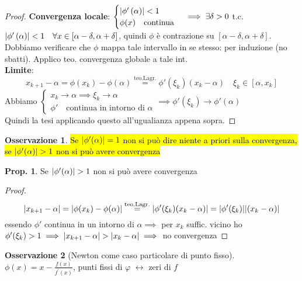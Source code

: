 \documentclass[a4paper,10pt]{article}
\theoremstyle{definition}
\theoremstyle{indentdefinition}
\theoremstyle{indenttheorem}
\newtheorem{prop}{Prop.}
\theoremstyle{myremark}
\newtheorem*{rem*}{Osservazione}
\theoremstyle{indentgeneral}
\theoremstyle{plain}
\theoremstyle{plain}
\newenvironment{myboxed} 
{\noindent\begin{lrbox}{\mybox}\begin{minipage}{\textwidth}}
{\end{minipage}\end{lrbox}\fbox{\usebox{\mybox}}}
\begin{document}
\begin{proof} \textbf{Convergenza locale}: $\begin{cases}
    \abs{\phi'\left(\alpha\right)}<1 \\
    \phi(x) \quad \text{continua}
\end{cases}\implies\exists\delta>0$ t.c. $\abs{\phi'\left(\alpha\right)}<1\quad \forall x\in [\alpha-\delta,\alpha+\delta]$, quindi $\phi$ è contrazione su $ [\alpha-\delta,\alpha+\delta]$. Dobbiamo verificare che $\phi$ mappa tale intervallo in se stesso: per induzione (no sbatti). Applico teo. convergenza globale a tale int. \\
 \textbf{Limite}:
 $$x_{k+1}-\alpha=\phi(x_k)-\phi(\alpha)\overset{\text{teo.Lagr.}}{=}\phi'(\xi_k)(x_k-\alpha)\quad \xi_k\in[\alpha,x_k]$$
 Abbiamo $\begin{cases}
     x_k\to\alpha\implies\xi_k\to\alpha\\
     \phi' \quad\text{continua in intorno di }\alpha
 \end{cases}\implies\phi'(\xi_k)\to \phi'(\alpha)$ \\
 Quindi la tesi applicando questo all'ugualianza appena sopra.
\end{proof}

\begin{rem*}
    \hl{Se $\abs{\phi'(\alpha)}=1$ non si può dire niente a priori sulla convergenza, se $\abs{\phi'(\alpha)}>1$ non si può avere convergenza}
\end{rem*}

\begin{myboxed}
    \begin{prop}
        Se $\abs{\phi'(\alpha)}>1$ non si può avere convergenza
    \end{prop}
\end{myboxed}

\begin{proof}
$$\abs{x_{k+1}-\alpha}=\abs{\phi(x_k)-\phi(\alpha)}\overset{\text{teo.Lagr.}}{=}\abs{\phi'(\xi_k)(x_k-\alpha)}=\abs{\phi'(\xi_k)}\abs{(x_k-\alpha)}$$
essendo $\phi'$ continua in un intorno di $\alpha\implies$ per $x_k$ suffic. vicino ho $\phi'(\xi_k)>1\implies\abs{x_{k+1}-\alpha}>\abs{x_{k}-\alpha}\implies$ no convergenza
\end{proof}

\begin{rem*}[Newton come caso particolare di punto fisso]
$\phi\left(x\right)=x-\frac{f\left(x\right)}{f^{\prime}\left(x\right)}$,
punti fissi di $\varphi$ $\leftrightarrow$ zeri di $f$
\end{rem*}
\end{document}
